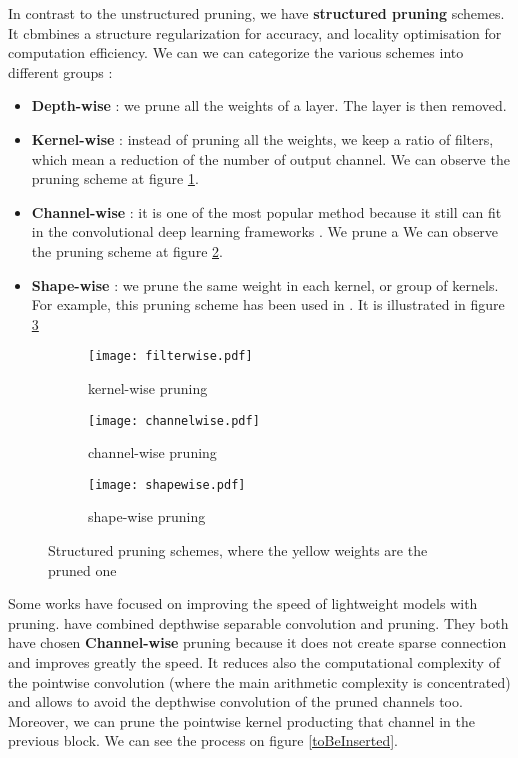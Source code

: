 %
In contrast to the unstructured pruning, we have \textbf{structured pruning} schemes. It cbmbines a structure regularization for accuracy, and locality optimisation for computation efficiency. We can we can categorize the various schemes into different groups \cite{wen_learning_2016, cheng_recent_2018}:
\begin{itemize}
    \item \textbf{Depth-wise} : we prune all the weights of a layer. The layer is then removed.
    \item \textbf{Kernel-wise} : instead of pruning all the weights, we keep a ratio of filters, which mean a reduction of the number of output channel. We can observe the pruning scheme at figure \ref{fig:struct_pruning:fw}.
    \item \textbf{Channel-wise} : it is one of the most popular method because it still can fit in the convolutional deep learning frameworks \cite{liu_rethinking_2019}. We prune a  We can observe the pruning scheme at figure \ref{fig:struct_pruning:chw}.
    \item \textbf{Shape-wise} : we prune the same weight in each kernel, or group of kernels. For example, this pruning scheme has been used in \textcite{zhu_efficient_2020}. It is illustrated in figure \ref{fig:struct_pruning:sw}
\end{itemize}
%
\begin{figure}
    \centering
    \begin{subfigure}{.32\textwidth}
    \centering
    \texttt{[image: filterwise.pdf]}
    \caption{kernel-wise pruning}
    \label{fig:struct_pruning:fw}
    \end{subfigure}
    \begin{subfigure}{.32\textwidth}
    \centering
    \texttt{[image: channelwise.pdf]}
    \caption{channel-wise pruning}
    \label{fig:struct_pruning:chw}
    \end{subfigure}
    \begin{subfigure}{.32\textwidth}
    \centering
    \texttt{[image: shapewise.pdf]}
    \caption{shape-wise pruning}
    \label{fig:struct_pruning:sw}
    \end{subfigure}
    \caption{Structured pruning schemes, where the yellow weights are the pruned one}
    \label{fig:struct_pruning}
\end{figure}
%
Some works have focused on improving the speed of lightweight models with pruning. \textcite{zhang_channel_2019, tu_pruning_2019} have combined depthwise separable convolution and pruning. They both have chosen \textbf{Channel-wise} pruning because it does not create sparse connection and improves greatly the speed. It reduces also the computational complexity of the pointwise convolution (where the main arithmetic complexity is concentrated) and allows to avoid the depthwise convolution of the pruned channels too. Moreover, we can prune the pointwise kernel producting that channel in the previous block. We can see the process on figure \ref{toBeInserted}.  \newline \newline
